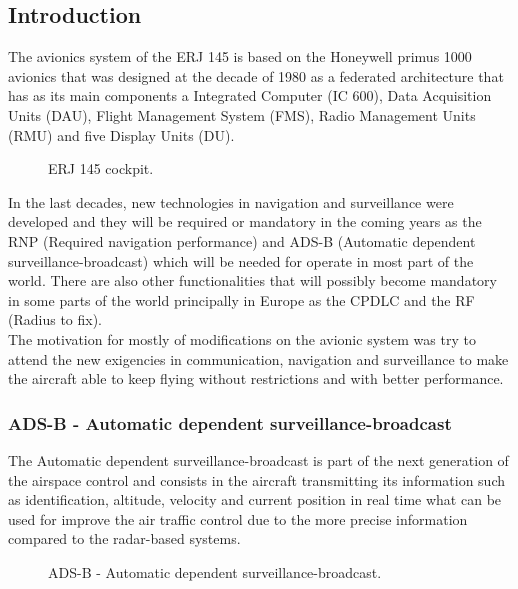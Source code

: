 \subsection{Introduction} 

The avionics system of the ERJ 145 is based on the Honeywell primus 1000 avionics that was designed at the decade of 1980 as a federated architecture that has as its main components a Integrated Computer (IC 600), Data Acquisition Units (DAU), Flight Management System (FMS), Radio Management Units (RMU) and five Display Units (DU). 

\begin{figure}[H] %
\caption{ERJ 145 cockpit.}
\label{fig:ERJ145Cockpit}
\end{figure} 

In the last decades, new technologies in navigation and surveillance were developed and they will be required or mandatory in the coming years as the RNP (Required navigation performance) and ADS-B (Automatic dependent surveillance-broadcast) which will be needed for operate in most part of the world. There are also other functionalities that will possibly become mandatory in some parts of the world principally in Europe as the CPDLC and the RF (Radius to fix).
\\The motivation for mostly of modifications on the avionic system was try to attend the new exigencies in communication, navigation and surveillance to make the aircraft able to keep flying without restrictions and with better performance.

\subsubsection{ADS-B - Automatic dependent surveillance-broadcast} 
The Automatic dependent surveillance-broadcast is part of the next generation of the airspace control and consists in the aircraft transmitting its information such as identification, altitude, velocity and current position in real time what can be used for improve the air traffic control due to the more precise information compared to the radar-based systems.
\begin{figure}[H] %
\caption{ADS-B - Automatic dependent surveillance-broadcast.}
\label{fig:ADSBSchema}
\end{figure} 

